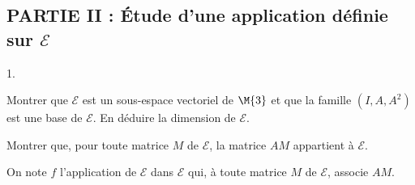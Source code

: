 \documentclass[11pt]{article}%
\begin{document}
\subsection*{PARTIE II : Étude d'une application définie sur 
$\mathcal{E}$}
\begin{noliste}{1.}
\setcounter{enumi}{4}
\item Montrer que $\mathcal{E}$ est un sous-espace vectoriel de 
$\M{3}$ et que la famille $(I,A,A^2)$ est une base 
de $\mathcal{E}$. En déduire la dimension de $\mathcal{E}$.




\item Montrer que, pour toute matrice $M$ de $\mathcal{E}$, la matrice 
$AM$ appartient à $\mathcal{E}$.


\end{noliste}

\noindent
On note $f$ l'application de $\mathcal{E}$ dans $\mathcal{E}$ qui, à 
toute matrice $M$ de $\mathcal{E}$, associe $AM$.
\end{document}
